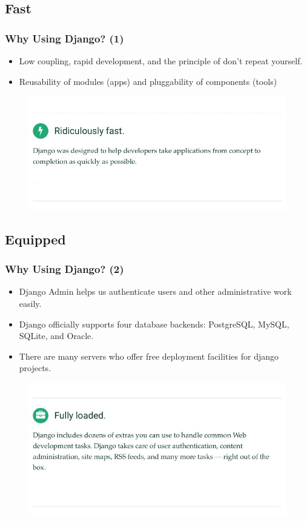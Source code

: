 \documentclass{beamer}
\begin{document}
\subsection{Fast}
\begin{frame}
\frametitle{Why Using Django? (1)}
	
	\begin{itemize}
		\item Low coupling, rapid development, and the principle of don't repeat yourself.
		\item Reusability of modules (apps) and pluggability of components (tools)
	\end{itemize}

	\begin{figure}
		\includegraphics[width=0.8\linewidth]{Pics/Django/index.jpeg}
	\end{figure}
\end{frame}

\subsection{Equipped}
\begin{frame}
\frametitle{Why Using Django? (2)}
\begin{itemize}
	\item Django Admin helps us authenticate users and other administrative work easily.
	\item Django officially supports four database backends: PostgreSQL, MySQL, SQLite, and Oracle.
	\item There are many servers who offer free deployment facilities for django projects.
\end{itemize}
\begin{figure}
	\includegraphics[width=0.8\linewidth]{Pics/Django/index2.jpeg}
\end{figure}
\end{frame}
\end{document}
